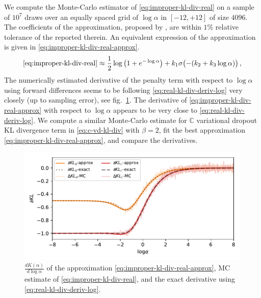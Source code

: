 \documentclass[a4paper,10pt,twocolumn]{article}
\newcommand{\cplx}{\mathbb{C}}
\begin{document}
We compute the Monte-Carlo estimator of \eqref{eq:improper-kl-div-real} on a sample of $10^7$
draws over an equally spaced grid of $\log \alpha$ in $[-12, +12]$ of size $4096$. The
coefficients of the approximation, proposed by \citet{molchanov_variational_2017}, are
within $1\%$ relative tolerance of the reported therein. An equivalent expression of the
approximation is given in \eqref{eq:improper-kl-div-real-approx}.
\begin{equation}  \label{eq:improper-kl-div-real-approx}
  \eqref{eq:improper-kl-div-real}
  \approx
    \frac12 \log{\bigl(1 + e^{-\log \alpha}\bigr)}
    + k_1 \sigma\bigl(- (k_2 + k_3 \log \alpha)\bigr)
  \,,
\end{equation}
The numerically estimated derivative of the penalty term with respect to $\log \alpha$ using
forward differences seems to be following \eqref{eq:real-kl-div-deriv-log} very closely (up to
sampling error), see fig.~\ref{fig:molchanov-derivative-replica}. The derivative of
\eqref{eq:improper-kl-div-real-approx} with respect to $\log \alpha$ appears to be very close
to \eqref{eq:real-kl-div-deriv-log}. We compute a similar Monte-Carlo estimate for
$\cplx$ variational dropout KL divergence term in \eqref{eq:c-vd-kl-div} with $\beta = 2$,
fit the best approximation \eqref{eq:improper-kl-div-real-approx}, and compare the derivatives.

\begin{figure}[!t]
  \centering
  \includegraphics[width=\columnwidth]{grad_log.pdf}
  \caption{$\tfrac{d K(\alpha)}{d \log{\alpha}}$ of the approximation
  \eqref{eq:improper-kl-div-real-approx}, MC estimate of \eqref{eq:improper-kl-div-real},
  and the exact derivative using \eqref{eq:real-kl-div-deriv-log}.}
  \label{fig:molchanov-derivative-replica}
\end{figure}
\end{document}
